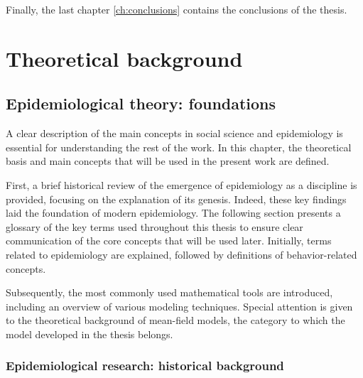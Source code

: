Finally, the last chapter \ref{ch:conclusions} contains the conclusions of the thesis. 
\chapter{Theoretical background}
\label{ch:theo_back}
\section{Epidemiological theory: foundations}

A clear description of the main concepts in social science and epidemiology is essential for understanding the rest of the work. In this chapter, the theoretical basis and main concepts that will be used in the present work are defined. 

First, a brief historical review of the emergence of epidemiology as a discipline is provided, focusing on the explanation of its genesis. Indeed, these key findings laid the foundation of modern  epidemiology. 
The following section presents a glossary of the key terms used throughout this thesis to ensure clear communication of the core concepts that will be used later. Initially, terms related to epidemiology are explained, followed by definitions of behavior-related concepts.

Subsequently, the most commonly used mathematical tools are introduced, including an overview of various modeling techniques. Special attention is given to the theoretical background of mean-field models, the category to which the model developed in the thesis belongs.

\subsection{Epidemiological research: historical background}
\label{subsec:history}

